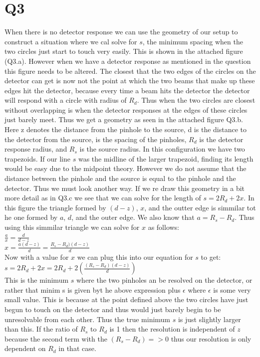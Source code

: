 \documentclass[12pt]{article}
\begin{document}
\section{Q3}
When there is no detector response we can use the geometry of our setup to construct a situation where we cal solve for $s$, the minimum spacing when the two circles just start to touch very easily. This is shown in the attached figure (Q3.a). However when we have a detector response as mentioned in the question this figure needs to be altered. The closest that the two edges of the circles on the detector can get is now not the point at which the two beams that make up these edges hit the detector, because every time a beam hits the detector the detector will respond with a circle with radius of $R_d$. Thus when the two circles are closest without overlapping is when the detector responses at the edges of these circles just barely meet. Thus we get a geometry as seen in the attached figure Q3.b. Here z denotes the distance from the pinhole to the source, d is the distance to the detector from the source,  is the spacing of the pinholes, $R_d$ is the detector response radius, and $R_s$ is the source radius. In this configuration we have two trapezoids. If our line $s$ was the midline of the larger trapezoid, finding its length would be easy due to the midpoint theory. However we do not assume that the distance between the pinhole and the source is equal to the pinhole and the detector. Thus we must look another way. If we re draw this geometry in a bit more detail as in Q3.c we see that we can solve for the length of $s = 2R_d+2x$. In this figure the triangle formed by $(d-z)$, $x$, and the outter edge is simmilar tot he one formed by $a$, $d$, and the outer edge. We also know that $a = R_s-R_d$. Thus using this simmilar triangle we can solve for $x$ as follows:\\
$\frac{a}{x} = \frac{d}{d-z}$\\
$x = \frac{a(d-z)}{d} = \frac{R_s-R_d)(d-z)}{d}$\\
Now with a value for $x$ we can plug this into our equation for $s$ to get:\\
$s = 2R_d +2x = 2R_d + 2(\frac{(R_s-R_d)(d-z)}{d})$\\
This is the minimum $s$ where the two pinholes an be resolved on the detector, or rather that minim s is given byt he above expression plus $\epsilon$ where $\epsilon$ is some very small value. This is because at the point defined above the two circles have just begun to touch on the detector and thus would just barely begin to be unresolvable from each other. Thus the true minimum $s$ is just slightly larger than this. If the ratio of $R_s$ to $R_d$ is 1 then the resolution is independent of $z$ because the second term with the $(R_s-R_d) => 0$ thus our resolution is only dependent on $R_d$ in that case.
\end{document}
